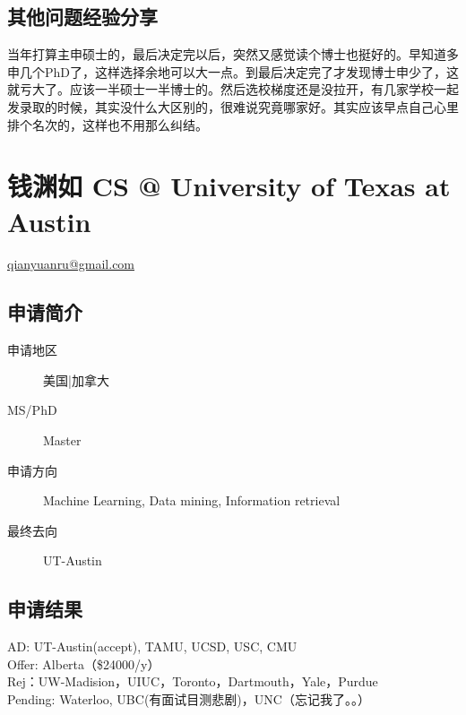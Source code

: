 \documentclass[11pt,fleqn,openany]{book} %
\begin{document}
\subsection*{其他问题经验分享}
当年打算主申硕士的，最后决定完以后，突然又感觉读个博士也挺好的。早知道多申几个PhD了，这样选择余地可以大一点。到最后决定完了才发现博士申少了，这就亏大了。应该一半硕士一半博士的。然后选校梯度还是没拉开，有几家学校一起发录取的时候，其实没什么大区别的，很难说究竟哪家好。其实应该早点自己心里排个名次的，这样也不用那么纠结。
\clearpage
\section{钱渊如 CS @ University of Texas at Austin}
\hfill \href{mailto:qianyuanru@gmail.com}{qianyuanru@gmail.com}

\noindent\begin{minipage}[t]{0.45\textwidth}
\subsection*{申请简介}
\begin{description}
\item[申请地区] 美国|加拿大
\item[MS/PhD] Master
\item[申请方向] Machine Learning, Data mining, Information retrieval
\item[最终去向] UT-Austin
\end{description}
\end{minipage}
\hfill
\begin{minipage}[t]{0.45\textwidth}
\subsection*{申请结果}
\noindent AD: UT-Austin(accept), TAMU, UCSD, USC, CMU\\
Offer: Alberta（\$24000/y）\\
Rej：UW-Madision，UIUC，Toronto，Dartmouth，Yale，Purdue\\
Pending: Waterloo, UBC(有面试目测悲剧)，UNC（忘记我了。。）
\end{minipage}
\end{document}
